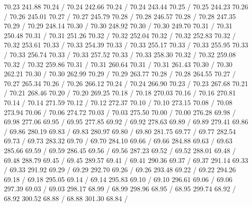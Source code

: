 { 70.23 241.88 70.24 /
 70.24 242.66 70.24 /
 70.24 243.44 70.25 /
 70.25 244.23 70.26 /
 70.26 245.01 70.27 /
 70.27 245.79 70.28 /
 70.28 246.57 70.28 /
 70.28 247.35 70.29 /
 70.29 248.14 70.30 /
 70.30 248.92 70.30 /
 70.30 249.70 70.31 /
 70.31 250.48 70.31 /
 70.31 251.26 70.32 /
 70.32 252.04 70.32 /
 70.32 252.83 70.32 /
 70.32 253.61 70.33 /
 70.33 254.39 70.33 /
 70.33 255.17 70.33 /
 70.33 255.95 70.33 /
 70.33 256.74 70.33 /
 70.33 257.52 70.33 /
 70.33 258.30 70.32 /
 70.32 259.08 70.32 /
 70.32 259.86 70.31 /
 70.31 260.64 70.31 /
 70.31 261.43 70.30 /
 70.30 262.21 70.30 /
 70.30 262.99 70.29 /
 70.29 263.77 70.28 /
 70.28 264.55 70.27 /
 70.27 265.34 70.26 /
 70.26 266.12 70.24 /
 70.24 266.90 70.23 /
 70.23 267.68 70.21 /
 70.21 268.46 70.20 /
 70.20 269.25 70.18 /
 70.18 270.03 70.16 /
 70.16 270.81 70.14 /
 70.14 271.59 70.12 /
 70.12 272.37 70.10 /
 70.10 273.15 70.08 /
 70.08 273.94 70.06 /
 70.06 274.72 70.03 /
 70.03 275.50 70.00 /
 70.00 276.28 69.98 /
 69.98 277.06 69.95 /
 69.95 277.85 69.92 /
 69.92 278.63 69.89 /
 69.89 279.41 69.86 /
 69.86 280.19 69.83 /
 69.83 280.97 69.80 /
 69.80 281.75 69.77 /
 69.77 282.54 69.73 /
 69.73 283.32 69.70 /
 69.70 284.10 69.66 /
 69.66 284.88 69.63 /
 69.63 285.66 69.59 /
 69.59 286.45 69.56 /
 69.56 287.23 69.52 /
 69.52 288.01 69.48 /
 69.48 288.79 69.45 /
 69.45 289.57 69.41 /
 69.41 290.36 69.37 /
 69.37 291.14 69.33 /
 69.33 291.92 69.29 /
 69.29 292.70 69.26 /
 69.26 293.48 69.22 /
 69.22 294.26 69.18 /
 69.18 295.05 69.14 /
 69.14 295.83 69.10 /
 69.10 296.61 69.06 /
 69.06 297.39 69.03 /
 69.03 298.17 68.99 /
 68.99 298.96 68.95 /
 68.95 299.74 68.92 /
 68.92 300.52 68.88 /
 68.88 301.30 68.84 /
}
